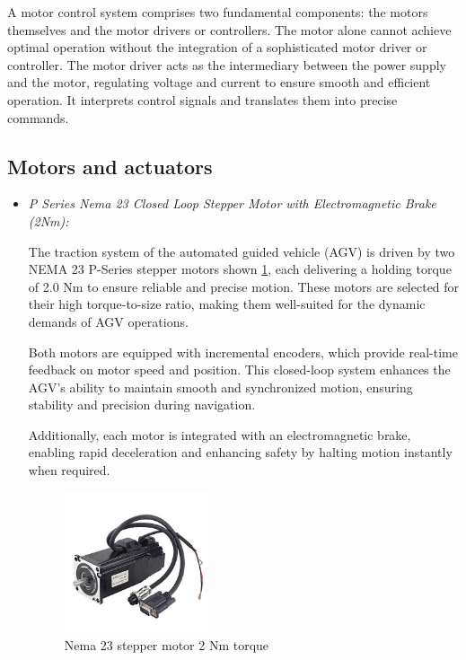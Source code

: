 \documentclass[../../main]{subfiles}
\begin{document}
A motor control system comprises two fundamental components: the motors themselves and the motor drivers or controllers. 
The motor alone cannot achieve optimal operation without the integration of a sophisticated motor driver or controller. 
The motor driver acts as the intermediary between the power supply and the motor, regulating voltage and current to ensure 
smooth and efficient operation. It interprets control signals and translates them into precise commands.
\newpage
\subsection{Motors and actuators}

\begin{itemize}
    \item \textit{P Series Nema 23 Closed Loop Stepper Motor with Electromagnetic
    Brake (2Nm):}

The traction system of the automated guided vehicle (AGV)  
is driven by two NEMA 23 P-Series stepper motors shown \cref{Nema 23 stepper motor},  
each delivering a holding torque of 2.0 Nm to ensure  
reliable and precise motion. These motors are selected  
for their high torque-to-size ratio, making them well-suited  
for the dynamic demands of AGV operations.  

Both motors are equipped with incremental encoders, which provide real-time feedback  
on motor speed and position. This closed-loop system  
enhances the AGV's ability to maintain smooth and synchronized  
motion, ensuring stability and precision during navigation.  

Additionally, each motor is integrated with an electromagnetic  
brake, enabling rapid deceleration and enhancing safety  
by halting motion instantly when required. 

\begin{figure}[H]
\centering
\includegraphics[width=0.4\textwidth]{fig/nema_motor.png}
\caption{Nema 23 stepper motor 2 Nm torque }
\label{Nema 23 stepper motor} %
\end{figure}


\end{itemize}
\end{document}
